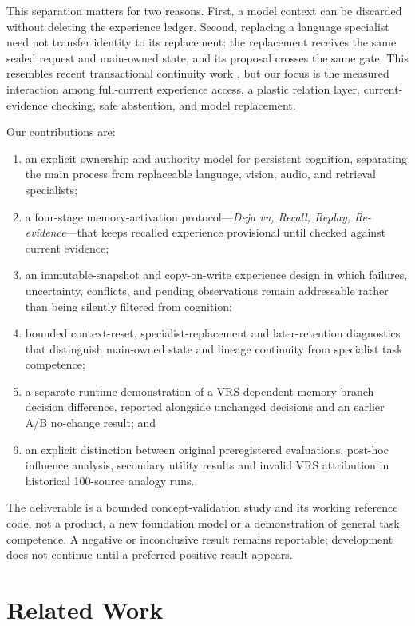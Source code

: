 \documentclass[11pt]{article}
\begin{document}
This separation matters for two reasons.  First, a model context can be discarded without deleting the experience ledger.  Second, replacing a language specialist need not transfer identity to its replacement: the replacement receives the same sealed request and main-owned state, and its proposal crosses the same gate.  This resembles recent transactional continuity work \cite{he2026continuity}, but our focus is the measured interaction among full-current experience access, a plastic relation layer, current-evidence checking, safe abstention, and model replacement.

Our contributions are:
\begin{enumerate}[leftmargin=1.5em]
  \item an explicit ownership and authority model for persistent cognition, separating the main process from replaceable language, vision, audio, and retrieval specialists;
  \item a four-stage memory-activation protocol---\emph{Deja vu, Recall, Replay, Re-evidence}---that keeps recalled experience provisional until checked against current evidence;
  \item an immutable-snapshot and copy-on-write experience design in which failures, uncertainty, conflicts, and pending observations remain addressable rather than being silently filtered from cognition;
  \item bounded context-reset, specialist-replacement and later-retention diagnostics that distinguish main-owned state and lineage continuity from specialist task competence;
  \item a separate runtime demonstration of a VRS-dependent memory-branch decision difference, reported alongside unchanged decisions and an earlier A/B no-change result; and
  \item an explicit distinction between original preregistered evaluations, post-hoc influence analysis, secondary utility results and invalid VRS attribution in historical 100-source analogy runs.
\end{enumerate}

The deliverable is a bounded concept-validation study and its working reference code, not a product, a new foundation model or a demonstration of general task competence. A negative or inconclusive result remains reportable; development does not continue until a preferred positive result appears.

\section{Related Work}
\end{document}
